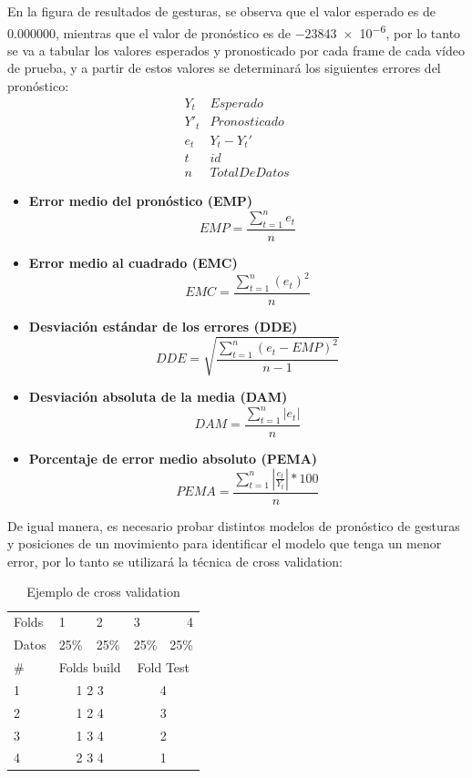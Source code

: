 \documentclass[twoside,twocolumn]{article}
\begin{document}
\medbreak
En la figura de resultados de gesturas, se observa que el valor esperado es de 0.000000, mientras que el valor de pronóstico es de \num{-23843e-6}, por lo tanto se va a tabular los valores esperados y pronosticado por cada frame de cada vídeo de prueba, y a partir de estos valores se determinará los siguientes errores del pronóstico:
\[
 \begin{matrix}
  Y_t & Esperado \\
  Y'_t & Pronosticado \\
  e_t & Y_t - Y_t' \\
  t & id \\
  n & TotalDeDatos
 \end{matrix}
\]
\begin{itemize}
\item \textbf{Error medio del pronóstico (EMP)}
\[
	EMP = \frac{\sum_{t=1}^{n} e_t}{n}
\]
\item \textbf{Error medio al cuadrado (EMC)}
\[
	EMC = \frac{\sum_{t=1}^{n} (e_t)^2}{n}
\]
\item \textbf{Desviación estándar de los errores (DDE)} 
\[
	DDE = \sqrt{\frac{\sum_{t=1}^{n} (e_t-EMP)^2}{n-1}}
\]
\item \textbf{Desviación absoluta de la media (DAM)} 
\[
	DAM = \frac{\sum_{t=1}^{n} |e_t|}{n}
\]
\item \textbf{Porcentaje de error medio absoluto (PEMA)}
\[
	PEMA = \frac{\sum_{t=1}^{n} |\frac{e_t}{Y_t}|*100}{n}
\]
\end{itemize}
De igual manera, es necesario probar distintos modelos de pronóstico de gesturas y posiciones de un movimiento para identificar el modelo que tenga un menor error, por lo tanto se utilizará la técnica de cross validation:
\begin{table}[H]
\caption{Ejemplo de cross validation}
\centering
\begin{tabular}{llllr}
\toprule
Folds & 1 & 2 & 3 & 4 \\
Datos & 25\% & 25\% & 25\% & 25\% \\
\midrule
\#  &  \multicolumn{2}{c}{Folds build} & \multicolumn{2}{c}{Fold Test} \\
1  & \multicolumn{2}{c}{1 2 3} & \multicolumn{2}{c}{4}\\
2  & \multicolumn{2}{c}{1 2 4} & \multicolumn{2}{c}{3}\\
3  & \multicolumn{2}{c}{1 3 4} & \multicolumn{2}{c}{2}\\
4  & \multicolumn{2}{c}{2 3 4} & \multicolumn{2}{c}{1}\\
\bottomrule
\end{tabular}
\end{table}
\end{document}
